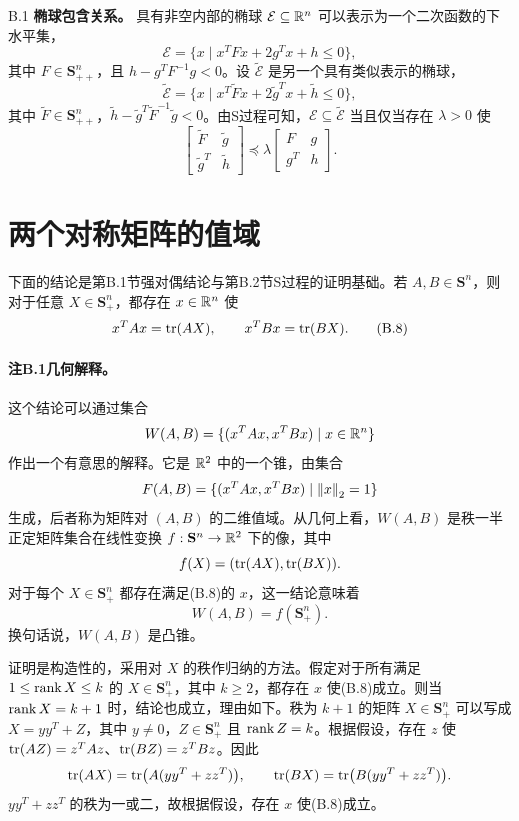 \begin{origexample}{B.1}
\textbf{椭球包含关系。} 具有非空内部的椭球 $\mathcal E\subseteq\mathbb R^n$ 可以表示为一个二次函数的下水平集，
\[
 \mathcal E=\{x\mid x^TFx+2g^Tx+h\leq0\},
\]
其中 $F\in\mathbf S_{++}^n$，且 $h-g^TF^{-1}g<0$。设 $\widetilde{\mathcal E}$ 是另一个具有类似表示的椭球，
\[
 \widetilde{\mathcal E}=\{x\mid x^T\widetilde F x+2\widetilde g^Tx+\widetilde h\leq0\},
\]
其中 $\widetilde F\in\mathbf S_{++}^n$，$\widetilde h-\widetilde g^T\widetilde F^{-1}\widetilde g<0$。由S过程可知，$\mathcal E\subseteq\widetilde{\mathcal E}$ 当且仅当存在 $\lambda>0$ 使
\[
 \begin{bmatrix}\widetilde F&\widetilde g\\\widetilde g^T&\widetilde h\end{bmatrix}
 \preceq\lambda\begin{bmatrix}F&g\\g^T&h\end{bmatrix}.
\]
\end{origexample}

\section{两个对称矩阵的值域}
下面的结论是第B.1节强对偶结论与第B.2节S过程的证明基础。若 $A,B\in\mathbf S^n$，则对于任意 $X\in\mathbf S_+^n$，都存在 $x\in\mathbb R^n$ 使
\begin{equation}
 x^TAx=\operatorname{tr}(AX),\qquad x^TBx=\operatorname{tr}(BX).\tag{B.8}
\end{equation}

\paragraph{注B.1\quad 几何解释。}
这个结论可以通过集合
\[
 W(A,B)=\{(x^TAx,x^TBx)\mid x\in\mathbb R^n\}
\]
作出一个有意思的解释。它是 $\mathbb R^2$ 中的一个锥，由集合
\[
 F(A,B)=\{(x^TAx,x^TBx)\mid\left\lVert x\right\rVert_2=1\}
\]
生成，后者称为矩阵对 $(A,B)$ 的二维值域。从几何上看，$W(A,B)$ 是秩一半正定矩阵集合在线性变换 $f:\mathbf S^n\to\mathbb R^2$ 下的像，其中
\[
 f(X)=(\operatorname{tr}(AX),\operatorname{tr}(BX)).
\]
对于每个 $X\in\mathbf S_+^n$ 都存在满足(B.8)的 $x$，这一结论意味着
\[
 W(A,B)=f(\mathbf S_+^n).
\]
换句话说，$W(A,B)$ 是凸锥。

证明是构造性的，采用对 $X$ 的秩作归纳的方法。假定对于所有满足 $1\leq\operatorname{rank} X\leq k$ 的 $X\in\mathbf S_+^n$，其中 $k\geq2$，都存在 $x$ 使(B.8)成立。则当 $\operatorname{rank} X=k+1$ 时，结论也成立，理由如下。秩为 $k+1$ 的矩阵 $X\in\mathbf S_+^n$ 可以写成 $X=yy^T+Z$，其中 $y\neq0$，$Z\in\mathbf S_+^n$ 且 $\operatorname{rank} Z=k$。根据假设，存在 $z$ 使 $\operatorname{tr}(AZ)=z^TAz$、$\operatorname{tr}(BZ)=z^TBz$。因此
\[
 \operatorname{tr}(AX)=\operatorname{tr}\bigl(A(yy^T+zz^T)\bigr),\qquad
 \operatorname{tr}(BX)=\operatorname{tr}\bigl(B(yy^T+zz^T)\bigr).
\]
$yy^T+zz^T$ 的秩为一或二，故根据假设，存在 $x$ 使(B.8)成立。

